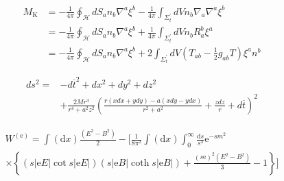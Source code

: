 \documentclass[11pt,a4paper]{book}
\begin{document}
\begin{equation}
    \left.\begin{aligned} M _ { \mathrm { K } } & = - \frac { 1 } { 4 \pi } \oint _ { \mathcal { H } } d S _ { a } n _ { b } \nabla ^ { a } \xi ^ { b } - \frac { 1 } { 4 \pi } \int _ { \Sigma _ { t } ^ { \prime } } d V n _ { b } \nabla _ { a } \nabla ^ { a } \xi ^ { b } \\ & = - \frac { 1 } { 4 \pi } \oint _ { \mathcal { H } } d S _ { a } n _ { b } \nabla ^ { a } \xi ^ { b } + \frac { 1 } { 4 \pi } \int _ { \Sigma _ { t } ^ { \prime } } d V n _ { b } R _ { a } ^ { b } \xi ^ { a } \\ & = - \frac { 1 } { 4 \pi } \oint _ { \mathcal { H } } d S _ { a } n _ { b } \nabla ^ { a } \xi ^ { b } + 2 \int _ { \Sigma _ { t } ^ { \prime } } d V \left( T _ { a b } - \frac { 1 } { 2 } g _ { a b } T \right) \xi ^ { a } n ^ { b } \end{aligned} \right.
\end{equation}
	
	
\begin{equation}
\left.\begin{aligned} d s ^ { 2 } = & - d \overline { t } ^ { 2 } + d x ^ { 2 } + d y ^ { 2 } + d z ^ { 2 } \\ & + \frac { 2 M r ^ { 3 } } { r ^ { 4 } + a ^ { 2 } z ^ { 2 } } \left( \frac { r ( x d x + y d y ) - a ( x d y - y d x ) } { r ^ { 2 } + a ^ { 2 } } + \frac { z d z } { r } + d \overline { t } \right) ^ { 2 } \end{aligned} \right.    
\end{equation}


\begin{equation}
    \left. \begin{array} { c } { W ^ { ( \mathrm { e } ) } = \int ( \mathrm { d } x ) \frac { \left( E ^ { 2 } - B ^ { 2 } \right) } { 2 } - [ \frac { 1 } { 8 \pi ^ { 2 } } \int ( \mathrm { d } x ) \int _ { 0 } ^ { \infty } \frac { \mathrm { d } s } { s ^ { 3 } } \mathrm { e } ^ { - s m ^ { 2 } } } \\ { \times \left\{ ( s | \mathrm { e } E | \cot s | \mathrm { e } E | ) ( s | \mathrm { e } B | \operatorname { coth } s | \mathrm { e } B | ) + \frac { ( s \mathrm { e } ) ^ { 2 } \left( E ^ { 2 } - B ^ { 2 } \right) } { 3 } - 1 \right\} ] } \end{array} \right.
\end{equation}









\end{document}
